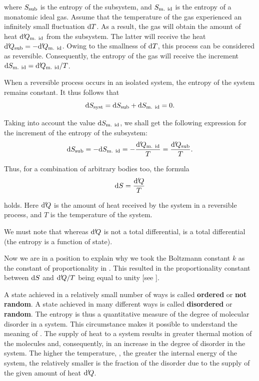 \noindent
where $S_{\text{sub}}$ is the entropy of the subsystem, and $S_{\text{m. id}}$ is the entropy of a monatomic ideal gas. Assume that the temperature of the gas experienced an infinitely small fluctuation $\mathrm{d} T$. As a result, the gas will obtain the amount of heat $\mathrm{d}'\!Q_{\text{m. id}}$ from the subsystem. The latter will receive the heat $\mathrm{d}'\!Q_{\text{sub}}=-\mathrm{d}'\!Q_{\text{m. id}}$. Owing to the smallness of $\mathrm{d} T$, this process can be considered as reversible. Consequently, the entropy of the gas will receive the increment $\mathrm{d}S_{\text{m. id}}=\mathrm{d}'\!Q_{\text{m. id}}/T$.

When a reversible process occurs in an isolated system, the entropy of the system remains constant. It thus follows that
\begin{equation*}
	\mathrm{d}S_{\text{syst}} = \mathrm{d}S_{\text{sub}} + \mathrm{d}S_{\text{m. id}} = 0.
\end{equation*}

\noindent
Taking into account the value $\mathrm{d}S_{\text{m. id}}$, we shall get the following expression for the increment of the entropy of the subsystem:
\begin{equation*}
	\mathrm{d}S_{\text{sub}} = -\mathrm{d}S_{\text{m. id}} = -\frac{\mathrm{d}'\!Q_{\text{m. id}}}{T} = \frac{\mathrm{d}'\!Q_{\text{sub}}}{T}.
\end{equation*}

\noindent
Thus, for a combination of arbitrary bodies too, the formula
\begin{equation}\label{eq:11_110}
	\mathrm{d} S = \frac{\mathrm{d}'\!Q}{T}
\end{equation}

\noindent
holds. Here $\mathrm{d}'\!Q$ is the amount of heat received by the system in a reversible process, and $T$ is the temperature of the system.

We must note that whereas $\mathrm{d}'\!Q$ is not a total differential,  is a total differential (the entropy is a function of state).

Now we are in a position to explain why we took the Boltzmann constant $k$ as the constant of proportionality in . This resulted in the proportionality constant between $\mathrm{d} S$ and $\mathrm{d}'\!Q/T$ being equal to unity [see ].

A state achieved in a relatively small number of ways is called \textbf{ordered} or \textbf{not random}. A state achieved in many different ways is called \textbf{disordered} or \textbf{random}. The entropy is thus a quantitative measure of the degree of molecular disorder in a system. This circumstance makes it possible to understand the meaning of . The supply of heat to a system results in greater thermal motion of the molecules and, consequently, in an increase in the degree of disorder in the system. The higher the temperature, \ie, the greater the internal energy of the system, the relatively smaller is the fraction of the disorder due to the supply of the given amount of heat $\mathrm{d}'\!Q$.

